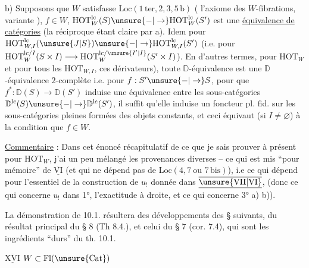 b) Supposons que $W$ satisfasse
$\mathrm{Loc}(1\,\mathrm{ter},2,3,5\,\mathrm{b})$ ( l'axiome  des $W$-fibrations, variante ),  
$f\in W$, $\mathrm{HOT}_{W}^{\mathrm{lc}}(S)\unsure{-|\to}\mathrm{HOT}_{W}^{\mathrm{lc}}(S')$ est une
\uline{équivalence de catégories} (la réciproque
étant claire par a). Idem pour
$\mathrm{HOT}_{W,I}^{\mathrm{lc}}(\unsure{J|S})\unsure{-|\to}\mathrm{HOT}_{W,I}^{\mathrm{lc}}(S')$ (i.e. pour
$\mathrm{HOT}_{W}^{\mathrm{lc}/I}(S\times I)\longrightarrow\mathrm{HOT}_{W}^{\mathrm{lc}/\unsure{I'|I}}(S'\times I)$). En
d'autres termes, pour  $\mathrm{HOT}_{W}$ et
pour tous les $\mathrm{HOT}_{W,I}$, 
ces dérivateurs), toute $\mathbb D$-équivalence
est une $\mathbb D$-équivalence $2$-complète
i.e. pour $f:S'\unsure{-|\to}S$, pour que $f^*:\mathbb D(S)\to\mathbb D(S')$
induise une  équivalence entre les
sous-catégories $\mathbb D^{\mathrm{lc}}(S)\unsure{-|\to}\mathbb D^{\mathrm{lc}}(S')$, il suffit 
qu'elle induise un foncteur pl. fid.
sur les sous-catégories pleines formées des
objets constants, et ceci équivaut (si $I\ne\varnothing$)
à la condition que $f\in W$.

\uline{Commentaire} : Dans cet énoncé récapitulatif de ce
que je sais prouver à présent pour $\mathrm{HOT}_{W}$, j'ai
un peu mélangé les provenances diverses --
ce qui est mis ``pour mémoire'' de $\overline{\underline{\mathrm{VI}}}$
(et qui ne dépend pas de $\mathrm{Loc}(4,7\ \text{ou }7\,\mathrm{bis})$),
i.e ce qui dépend pour l'essentiel de la
construction de $u_!$ donnée dans $\overline{\underline{\unsure{\mathrm{VII}|\mathrm{VI}}}}$, 
(donc ce qui concerne $u_!$ dans 1°, \uline{}
l'exactitude à droite, et  ce qui concerne
3° a) b)).

La démonstration de 10.1. résultera des
développements des § suivants,   du
résultat principal du § 8 (Th 8.4.), et 
celui du § 7 (cor. 7.4), qui sont les
ingrédients ``durs'' du th. 10.1.

$\overline{\underline{\mathrm{XVI}}}$ 
$W\subset\mathrm{Fl}(\unsure{\mathrm{Cat}})$


